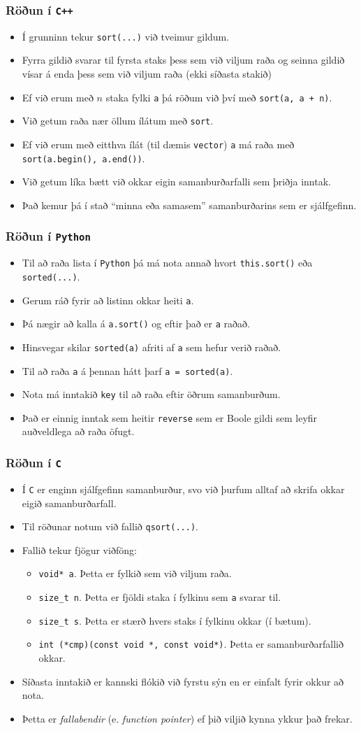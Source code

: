\documentclass{beamer}
\newcommand\env[2]
{
	\begin{#1}
	#2
	\end{#1}
}
\begin{document}
\env{frame}
{
	\frametitle{Röðun í \texttt{C++}}
	\env{itemize}
	{
		\item<1-> Í grunninn tekur \texttt{sort(...)} við tveimur gildum.
		\item<2-> Fyrra gildið svarar til fyrsta staks þess sem við viljum raða og seinna gildið vísar á enda þess sem við viljum raða
			(ekki síðasta stakið)
		\item<3-> Ef við erum með $n$ staka fylki \texttt{a} þá röðum við því með \texttt{sort(a, a + n)}.
		\item<4-> Við getum raða nær öllum ílátum með \texttt{sort}.
		\item<5-> Ef við erum með eitthva ílát (til dæmis \texttt{vector}) \texttt{a} má raða með \texttt{sort(a.begin(), a.end())}.
		\item<6-> Við getum líka bætt við okkar eigin samanburðarfalli sem þriðja inntak.
		\item<7-> Það kemur þá í stað ``minna eða samasem'' samanburðarins sem er sjálfgefinn.
	}
}

\env{frame}
{
	\frametitle{Röðun í \texttt{Python}}
	\env{itemize}
	{
		\item<1-> Til að raða lista í \texttt{Python} þá má nota annað hvort \texttt{this.sort()} eða \texttt{sorted(...)}.
		\item<2-> Gerum ráð fyrir að listinn okkar heiti \texttt{a}.
		\item<3-> Þá nægir að kalla á \texttt{a.sort()} og eftir það er \texttt{a} raðað.
		\item<4-> Hinsvegar skilar \texttt{sorted(a)} afriti af \texttt{a} sem hefur verið raðað.
		\item<5-> Til að raða \texttt{a} á þennan hátt þarf \texttt{a = sorted(a)}.
		\item<6-> Nota má inntakið \texttt{key} til að raða eftir öðrum samanburðum.
		\item<7-> Það er einnig inntak sem heitir \texttt{reverse} sem er Boole gildi sem leyfir auðveldlega að raða öfugt.
	}
}

\env{frame}
{
	\frametitle{Röðun í \texttt{C}}
	\env{itemize}
	{
		\item<1-> Í \texttt{C} er enginn sjálfgefinn samanburður, svo við þurfum alltaf að skrifa okkar eigið samanburðarfall.
		\item<2-> Til röðunar notum við fallið \texttt{qsort(...)}.
		\item<3-> Fallið tekur fjögur viðföng:
		\env{itemize}
		{
			\item<4-> \texttt{void* a}. Þetta er fylkið sem við viljum raða.
			\item<5-> \texttt{size\_t n}. Þetta er fjöldi staka í fylkinu sem \texttt{a} svarar til.
			\item<6-> \texttt{size\_t s}. Þetta er stærð hvers staks í fylkinu okkar (í bætum).
			\item<7-> \texttt{int (*cmp)(const void *, const void*)}. Þetta er samanburðarfallið okkar.
		}
		\item<8-> Síðasta inntakið er kannski flókið við fyrstu sýn en er einfalt fyrir okkur að nota.
		\item<9-> Þetta er \emph{fallabendir} (e. \emph{function pointer}) ef þið viljið kynna ykkur það frekar.
	}
}
\end{document}
